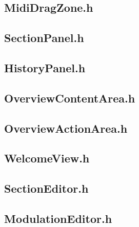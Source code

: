 \subsection{MidiDragZone.h}


\subsection{SectionPanel.h}


\subsection{HistoryPanel.h}


\subsection{OverviewContentArea.h}


\subsection{OverviewActionArea.h}


\subsection{WelcomeView.h}


\subsection{SectionEditor.h}


\subsection{ModulationEditor.h}


